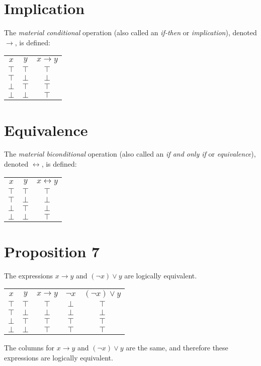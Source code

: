 \documentclass[12pt]{article}
\begin{document}
\section*{Implication}
The \textit{material conditional} operation (also called an \textit{if-then} or \textit{implication}), denoted $\rightarrow$, is defined:
\begin{center}
\begin{tabular}{c|c||c}
$x$&$y$&$x\rightarrow y$\\
$\top$&$\top$&$\top$\\
$\top$&$\bot$&$\bot$\\
$\bot$&$\top$&$\top$\\
$\bot$&$\bot$&$\top$
\end{tabular}
\end{center}
\section*{Equivalence}
The \textit{material biconditional} operation (also called an \textit{if and only if} or \textit{equivalence}), denoted $\leftrightarrow$, is defined:
\begin{center}
\begin{tabular}{c|c||c}
$x$&$y$&$x\leftrightarrow y$\\
$\top$&$\top$&$\top$\\
$\top$&$\bot$&$\bot$\\
$\bot$&$\top$&$\bot$\\
$\bot$&$\bot$&$\top$
\end{tabular}
\end{center}
\section*{Proposition 7}
The expressions $x\rightarrow y$ and $(\lnot x)\lor y$ are logically equivalent.
\begin{center}
\begin{tabular}{c|c|c|c|c}
$x$&$y$&$x\rightarrow y$&$\lnot x$&$(\lnot x)\lor y$\\
$\top$&$\top$&$\top$&$\bot$&$\top$\\
$\top$&$\bot$&$\bot$&$\bot$&$\bot$\\
$\bot$&$\top$&$\top$&$\top$&$\top$\\
$\bot$&$\bot$&$\top$&$\top$&$\top$
\end{tabular}
\end{center}
The columns for $x\rightarrow y$ and $(\lnot x)\lor y$ are the same, and therefore these expressions are logically equivalent.
\end{document}
